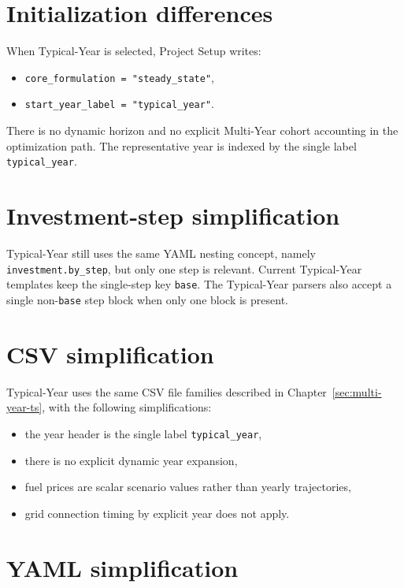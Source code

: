 \documentclass[11pt,a4paper]{report}
\newcommand{\code}[1]{\texttt{#1}}
\begin{document}
\section{Initialization differences}

When Typical-Year is selected, Project Setup writes:

\begin{itemize}[leftmargin=1.5em]
  \item \code{core\_formulation = "steady\_state"},
  \item \code{start\_year\_label = "typical\_year"}.
\end{itemize}

There is no dynamic horizon and no explicit Multi-Year cohort accounting in the optimization path. The representative year is indexed by the single label \code{typical\_year}.

\section{Investment-step simplification}

Typical-Year still uses the same YAML nesting concept, namely \code{investment.by\_step}, but only one step is relevant. Current Typical-Year templates keep the single-step key \code{base}. The Typical-Year parsers also accept a single non-\code{base} step block when only one block is present.

\section{CSV simplification}

Typical-Year uses the same CSV file families described in Chapter~\ref{sec:multi-year-ts}, with the following simplifications:

\begin{itemize}[leftmargin=1.5em]
  \item the year header is the single label \code{typical\_year},
  \item there is no explicit dynamic year expansion,
  \item fuel prices are scalar scenario values rather than yearly trajectories,
  \item grid connection timing by explicit year does not apply.
\end{itemize}

\section{YAML simplification}
\end{document}
